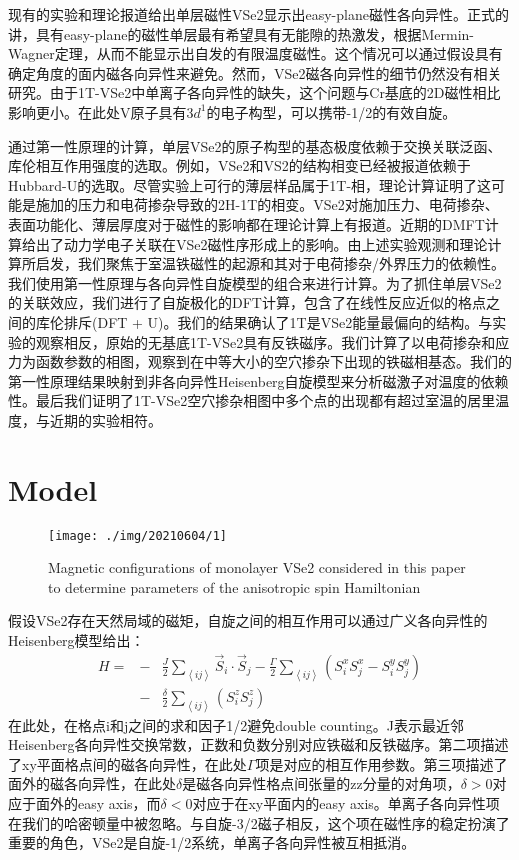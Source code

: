 \documentclass[reprint, aps, prb, showkeys]{revtex4-2}
\begin{document}
现有的实验和理论报道给出单层磁性VSe2显示出easy-plane磁性各向异性。正式的讲，具有easy-plane的磁性单层最有希望具有无能隙的热激发，根据Mermin-Wagner定理，从而不能显示出自发的有限温度磁性。这个情况可以通过假设具有确定角度的面内磁各向异性来避免。然而，VSe2磁各向异性的细节仍然没有相关研究。由于1T-VSe2中单离子各向异性的缺失，这个问题与Cr基底的2D磁性相比影响更小。在此处V原子具有$3d^1$的电子构型，可以携带-1/2的有效自旋。

通过第一性原理的计算，单层VSe2的原子构型的基态极度依赖于交换关联泛函、库伦相互作用强度的选取。例如，VSe2和VS2的结构相变已经被报道依赖于Hubbard-U的选取。尽管实验上可行的薄层样品属于1T-相，理论计算证明了这可能是施加的压力和电荷掺杂导致的2H-1T的相变。VSe2对施加压力、电荷掺杂、表面功能化、薄层厚度对于磁性的影响都在理论计算上有报道。近期的DMFT计算给出了动力学电子关联在VSe2磁性序形成上的影响。由上述实验观测和理论计算所启发，我们聚焦于室温铁磁性的起源和其对于电荷掺杂/外界压力的依赖性。我们使用第一性原理与各向异性自旋模型的组合来进行计算。为了抓住单层VSe2的关联效应，我们进行了自旋极化的DFT计算，包含了在线性反应近似的格点之间的库伦排斥(DFT + U)。我们的结果确认了1T是VSe2能量最偏向的结构。与实验的观察相反，原始的无基底1T-VSe2具有反铁磁序。我们计算了以电荷掺杂和应力为函数参数的相图，观察到在中等大小的空穴掺杂下出现的铁磁相基态。我们的第一性原理结果映射到非各向异性Heisenberg自旋模型来分析磁激子对温度的依赖性。最后我们证明了1T-VSe2空穴掺杂相图中多个点的出现都有超过室温的居里温度，与近期的实验相符。

\section{Model}
\begin{figure*}[t]
    \texttt{[image: ./img/20210604/1]}
    \caption{\label{fig:Configuration} 
    Magnetic configurations of monolayer VSe2 considered in this paper to determine parameters of the anisotropic spin Hamiltonian
    }
\end{figure*}
假设VSe2存在天然局域的磁矩，自旋之间的相互作用可以通过广义各向异性的Heisenberg模型给出：
\begin{eqnarray}
    H = &-& \frac{J}{2} \sum_{\left\langle i j \right\rangle} \vec{S}_i \cdot \vec{S}_j - \frac{\Gamma}{2} \sum_{\left\langle i j \right\rangle} \left( S_i^x S_j^x - S_i^y S_j^y \right)\\
    &-& \frac{\delta}{2} \sum_{\left\langle i j \right\rangle} \left( S_i^z S_j^z \right)\label{eqn:Hamiltonian}
\end{eqnarray}
在此处，在格点i和j之间的求和因子1/2避免double counting。J表示最近邻Heisenberg各向异性交换常数，正数和负数分别对应铁磁和反铁磁序。第二项描述了xy平面格点间的磁各向异性，在此处$\Gamma$项是对应的相互作用参数。第三项描述了面外的磁各向异性，在此处$\delta$是磁各向异性格点间张量的zz分量的对角项，$\delta > 0$对应于面外的easy axis，而$\delta < 0$对应于在xy平面内的easy axis。单离子各向异性项在我们的哈密顿量中被忽略。与自旋-3/2磁子相反，这个项在磁性序的稳定扮演了重要的角色，VSe2是自旋-1/2系统，单离子各向异性被互相抵消。
\end{document}
